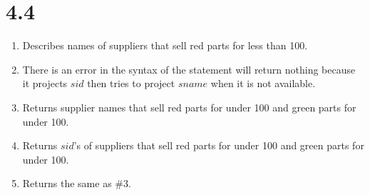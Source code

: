 \documentclass[11pt]{article}
\begin{document}
\section*{4.4}
\begin{enumerate}
\item Describes names of suppliers that sell red parts for less than 100.
\item There is an error in the syntax of the statement will return nothing because it projects $sid$ then tries to project $sname$ when it is not available.
\item Returns supplier names that sell red parts for under 100 and green parts for under 100.
\item Returns $sid$'s of suppliers that sell red parts for under 100 and green parts for under 100.
\item Returns the same as \#3.
\end{enumerate}
\end{document}
